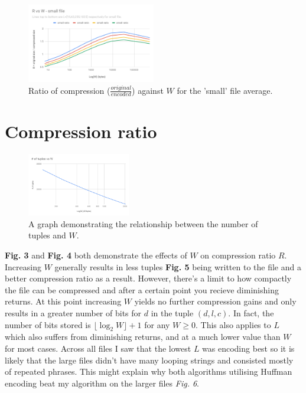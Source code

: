 \documentclass[a4paper, 10pt]{article}
\begin{document}
\begin{figure}
  \centering
  \includegraphics[width=0.5\textwidth]{RvsWsmallfile.pdf}
  \caption{Ratio of compression ($\frac{original}{encoded}$) against $W$ for the 'small' file average.}
\end{figure}

\section{Compression ratio}

\begin{figure}
  \centering
  \includegraphics[width=0.4\textwidth]{TUPLESvsW.pdf}
  \caption{A graph demonstrating the relationship between the number of tuples and $W$.}
\end{figure}

\textbf{Fig. 3} and \textbf{Fig. 4} both demonstrate the effects of $W$ on compression ratio $R$. Increasing $W$ generally results in less tuples \textbf{Fig. 5} being written to the file and a better compression ratio as a result. However, there's a limit to how compactly the file can be compressed and after a certain point you recieve diminishing returns. At this point increasing $W$ yields no further compression gains and only results in a greater number of bits for $d$ in the tuple $(d,l,c)$. In fact, the number of bits stored is $\lfloor\log_2W\rfloor+1$ for any $W\geq0$. This also applies to $L$ which also suffers from diminishing returns, and at a much lower value than $W$ for most cases. Across all files I saw that the lowest $L$ was encoding best so it is likely that the large files didn't have many looping strings and consisted mostly of repeated phrases. This might explain why both algorithms utilising Huffman encoding beat my algorithm on the larger files \textit{Fig. 6}.
\end{document}
